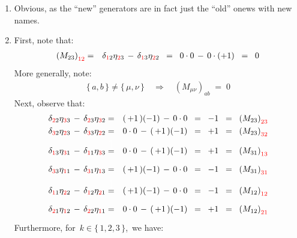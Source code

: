 \begin{enumerate}
\item
	Obvious, as the ``new'' generators are in fact just the ``old'' onews with new names.
\item
	First, note that:
	\begin{eqnarray*}
	\left(M_{23}\right)_{{\color{red}12}}
	& = &
		\delta_{{\color{red}1}2}\eta_{{\color{red}2}3}
		\,-\,
		\delta_{{\color{red}1}3}\eta_{{\color{red}2}2}
	\;\; = \;\;
		0 \cdot 0 \,-\, 0 \cdot (+1)
	\;\; = \;\;
		0
	\end{eqnarray*}
	More generally, note:
	\begin{eqnarray*}
	\{\,a,b\,\} \neq \{\,\mu,\nu\,\}
	\quad\Longrightarrow\quad
	\left(M_{\mu\nu}\right)_{ab} \;=\; 0
	\end{eqnarray*}
	Next, observe that:
	\begin{eqnarray*}
	\delta_{{\color{red}2}2}\eta_{{\color{red}3}3}
	\,-\,
	\delta_{{\color{red}2}3}\eta_{{\color{red}3}2}
	& = &
		(\,+1\,)(-1) \,-\, 0 \cdot 0
	\;\; = \;\;
		-1
	\;\; = \;\;
		\left(M_{23}\right)_{{\color{red}23}}
	\\
	\delta_{{\color{red}3}2}\eta_{{\color{red}2}3}
	\,-\,
	\delta_{{\color{red}3}3}\eta_{{\color{red}2}2}
	& = &
		0 \cdot 0 \,-\, (\,+1\,)(-1)
	\;\; = \;\;
		+1
	\;\; = \;\;
		\left(M_{23}\right)_{{\color{red}32}}
	\\
	\delta_{{\color{red}1}3}\eta_{{\color{red}3}1}
	\,-\,
	\delta_{{\color{red}1}1}\eta_{{\color{red}3}3}
	& \overset{{\color{white}\textnormal{\Large$1$}}}{=} &
		0 \cdot 0 \,-\, (\,+1\,)(-1)
	\;\; = \;\;
		+1
	\;\; = \;\;
		\left(M_{31}\right)_{{\color{red}13}}
	\\
	\delta_{{\color{red}3}3}\eta_{{\color{red}1}1}
	\,-\,
	\delta_{{\color{red}3}1}\eta_{{\color{red}1}3}
	& = &
		(\,+1\,)(-1) \,-\, 0 \cdot 0
	\;\; = \;\;
		-1
	\;\; = \;\;
		\left(M_{31}\right)_{{\color{red}31}}
	\\
	\delta_{{\color{red}1}1}\eta_{{\color{red}2}2}
	\,-\,
	\delta_{{\color{red}1}2}\eta_{{\color{red}2}1}
	& \overset{{\color{white}\textnormal{\Large$1$}}}{=} &
		(\,+1\,)(-1) \,-\, 0 \cdot 0
	\;\; = \;\;
		-1
	\;\; = \;\;
	\left(M_{12}\right)_{{\color{red}12}}
	\\
	\delta_{{\color{red}2}1}\eta_{{\color{red}1}2}
	\,-\,
	\delta_{{\color{red}2}2}\eta_{{\color{red}1}1}
	& = &
		0 \cdot 0 \,-\, (\,+1\,)(-1)
	\;\; = \;\;
		+1
	\;\; = \;\;
		\left(M_{12}\right)_{{\color{red}21}}
	\end{eqnarray*}
	Furthermore, for \,$k \in \{\,1,2,3\,\}$,\, we have:

\end{enumerate}

